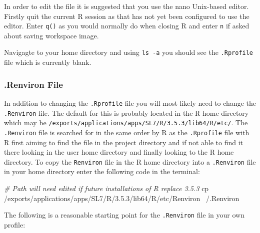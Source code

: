 \documentclass[]{book}
\newenvironment{Shaded}{\begin{snugshade}}{\end{snugshade}}
\newcommand{\CommentTok}[1]{\textcolor[rgb]{0.56,0.35,0.01}{\textit{#1}}}
\newcommand{\FunctionTok}[1]{\textcolor[rgb]{0.00,0.00,0.00}{#1}}
\newcommand{\NormalTok}[1]{#1}
\begin{document}
In order to edit the file it is suggested that you use the nano Unix-based editor. Firstly quit the current R session as that has not yet been configured to use the editor. Enter \texttt{q()} as you would normally do when closing R and enter \texttt{n} if asked about saving workspace image.

Navigagte to your home directory and using \texttt{ls\ -a} you should see the \texttt{.Rprofile} file which is currently blank.

\hypertarget{renviron-file}{%
\subsubsection{.Renviron File}\label{renviron-file}}

In addition to changing the \texttt{.Rprofile} file you will most likely need to change the \texttt{.Renviron} file. The default for this is probably located in the R home directory which may be \texttt{/exports/applications/apps/SL7/R/3.5.3/lib64/R/etc/}. The \texttt{.Renviron} file is searched for in the same order by R as the \texttt{.Rprofile} file with R first aiming to find the file in the project directory and if not able to find it there looking in the user home directory and finally looking to the R home directory. To copy the \texttt{Renviron} file in the R home directory into a \texttt{.Renviron} file in your home directory enter the following code in the terminal:

\begin{Shaded}
\begin{Highlighting}[]
\CommentTok{# Path will need edited if future installations of R replace 3.5.3}
\FunctionTok{cp}\NormalTok{ /exports/applications/apps/SL7/R/3.5.3/lib64/R/etc/Renviron ~/.Renviron}
\end{Highlighting}
\end{Shaded}

The following is a reasonable starting point for the \texttt{.Renviron} file in your own profile:
\end{document}
